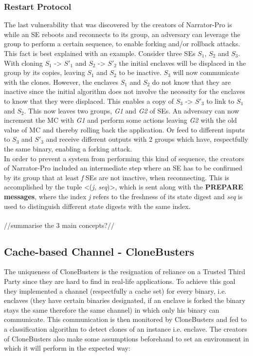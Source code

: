 \subsubsection{Restart Protocol}
The last vulnerability that was discovered by the creators of Narrator-Pro is while an SE reboots and reconnects to its group, an adversary can leverage the group to perform a certain sequence, to enable forking and/or rollback attacks. This fact is best explained with an example. Consider three SEs \(S_{1}\), \(S_{2}\) and \(S_{3}\). With cloning \(S_{1}\) -> \(S'_{1}\) and \(S_{2}\) -> \(S'_{2}\) the initial enclaves will be displaced in the group by its copies, leaving \(S_{1}\) and \(S_{2}\) to be inactive. \(S_{3}\) will now communicate with the clones. However, the enclaves \(S_{1}\) and \(S_{2}\) do not know that they are inactive since the initial algorithm does not involve the necessity for the enclaves to know that they were displaced. This enables a copy of \(S_{3}\) -> \(S'_{3}\) to link to \(S_{1}\) and \(S_{2}\). This now leaves two groups, \textit{G1} and \textit{G2} of SEs. An adversary can now increment the MC with \textit{G1} and perform some actions leaving \textit{G2} with the old value of MC and thereby rolling back the application. Or feed to different inputs to \(S_{3}\) and \(S'_{3}\) and receive different outputs with 2 groups which have, respectfully the same binary, enabling a forking attack.\\
In order to prevent a system from performing this kind of sequence, the creators of Narrator-Pro included an intermediate step where an SE has to be confirmed by its group that at least \textit{f} SEs are not inactive, when reconnecting. This is accomplished by the tuple <(\textit{j}, \textit{seq})>, which is sent along with the \textbf{PREPARE messages}, where the index \textit{j} refers to the freshness of its state digest and \textit{seq} is used to distinguish different state digests with the same index.\\
\\ 

//summarise the 3 main concepts?//


\subsection{Cache-based Channel - CloneBusters}

The uniqueness of CloneBusters is the resignation of reliance on a Trusted Third Party since they are hard to find in real-life applications. To achieve this goal they implemented a channel (respectfully a cache set) for every binary, i.e. enclaves (they have certain binaries designated, if an enclave is forked the binary stays the same therefore the same channel) in which only his binary can communicate. This communication is then monitored by CloneBusters and fed to a classification algorithm to detect clones of an instance i.e. enclave. The creators of CloneBusters also make some assumptions beforehand to set an environment in which it will perform in the expected way: 


